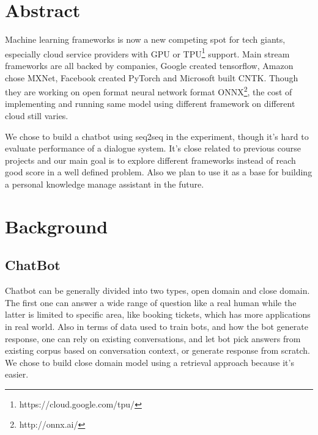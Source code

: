 \documentclass[11pt,letterpaper,twocolumn,oneside]{article}
\begin{document}

\section{Abstract}

Machine learning frameworks is now a new competing spot for tech giants,
especially cloud service providers with GPU or TPU\footnote{https://cloud.google.com/tpu/} support.
Main stream frameworks are all backed by companies,
Google created tensorflow, Amazon chose MXNet, Facebook created PyTorch and Microsoft built CNTK.
Though they are working on open format neural network format ONNX\footnote{http://onnx.ai/},
the cost of implementing and running same model using different framework on different cloud still varies.

We chose to build a chatbot using seq2seq in the experiment,
though it's hard to evaluate performance of a dialogue system\cite{liu2016not}.
It's close related to previous course projects and our main goal is to explore different frameworks
instead of reach good score in a well defined problem.
Also we plan to use it as a base for building a personal knowledge manage assistant in the future.

\section{Background}

\subsection{ChatBot}

Chatbot can be generally divided into two types,
open domain and close domain. The first one can answer a wide range of question
like a real human while the latter is limited to specific area, like booking tickets,
which has more applications in real world.
Also in terms of data used to train bots, and how the bot generate response,
one can rely on existing conversations, and let bot pick answers from existing corpus
based on conversation context, or generate response from scratch.
We chose to build close domain model using a retrieval approach because it's easier.
\end{document}
